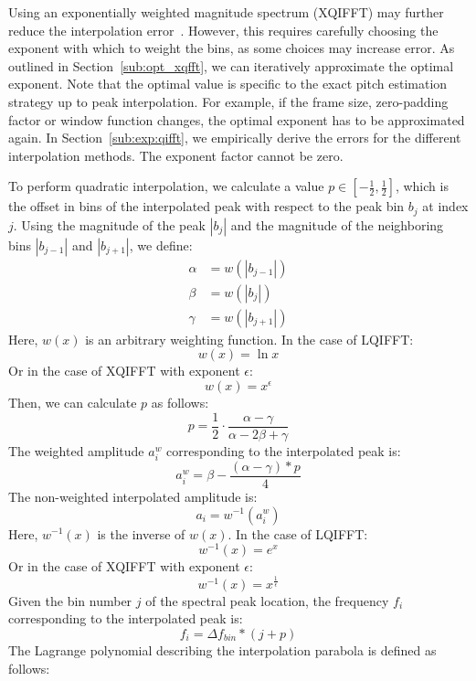 \documentclass[a4paper,10pt,twocolumn]{article}
\begin{document}
Using an exponentially weighted magnitude spectrum (XQIFFT) may further reduce the interpolation error~\cite{interpolnozero}. However, this requires carefully choosing the exponent with which to weight the bins, as some choices may increase error. As outlined in Section~\ref{sub:opt_xqfft}, we can iteratively approximate the optimal exponent. Note that the optimal value is specific to the exact pitch estimation strategy up to peak interpolation. For example, if the frame size, zero-padding factor or window function changes, the optimal exponent has to be approximated again. In Section~\ref{sub:exp:qifft}, we empirically derive the errors for the different interpolation methods. The exponent factor cannot be zero.

To perform quadratic interpolation, we calculate a value $p \in [-\frac{1}{2}, \frac{1}{2}]$, which is the offset in bins of the interpolated peak with respect to the peak bin $b_j$ at index $j$. Using the magnitude of the peak $|b_j|$ and the magnitude of the neighboring bins $|b_{j - 1}|$ and $|b_{j + 1}|$, we define:
\begin{align*}
    \alpha &= w(|b_{j - 1}|) \\
    \beta  &= w(|b_{j}|) \\
    \gamma &= w(|b_{j + 1}|)
\end{align*}
Here, $w(x)$ is an arbitrary weighting function. In the case of LQIFFT:
\[ w(x) = \ln{x} \]
Or in the case of XQIFFT with exponent $\epsilon$:
\[ w(x) = x^{\epsilon} \]
Then, we can calculate $p$ as follows:
\[ p = \frac{1}{2} \cdot \frac{\alpha - \gamma}{\alpha - 2\beta + \gamma} \]
The weighted amplitude $a_i^w$ corresponding to the interpolated peak is:
\[ a_i^w = \beta - \frac{(\alpha - \gamma) * p}{4} \]
The non-weighted interpolated amplitude is:
\[ a_i = w^{-1}(a_i^w) \]
Here, $w^{-1}(x)$ is the inverse of $w(x)$. In the case of LQIFFT:
\[ w^{-1}(x) = e^{x} \]
Or in the case of XQIFFT with exponent $\epsilon$:
\[ w^{-1}(x) = x^{\frac{1}{\epsilon}} \]
Given the bin number $j$ of the spectral peak location, the frequency $f_i$ corresponding to the interpolated peak is:
\[ f_i = \Delta f_{bin} * (j + p) \]
The Lagrange polynomial describing the interpolation parabola is defined as follows:
\end{document}
